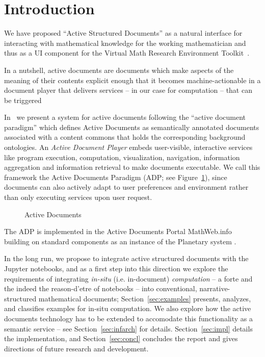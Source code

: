 \section{Introduction}\label{sec:intro}

We have proposed ``Active Structured Documents'' as a natural interface for interacting
with mathematical knowledge for the working mathematician and thus as a UI component for
the \pn Virtual Math Research Environment Toolkit~\cite{ODK-D4.2}.

In a nutshell, active documents are documents which make aspects of the meaning of their
contents explicit enough that it becomes machine-actionable in a document player that
delivers services -- in our case for computation -- that can be triggered 

In~\cite{KohDavGin:psewads11} we present a system for active documents following the
``active document paradigm'' which defines Active Documents as semantically annotated
documents associated with a content commons that holds the corresponding background
ontologies. An \textit{Active Document Player} embeds user-visible, interactive services
like program execution, computation, visualization, navigation, information aggregation
and information retrieval to make documents executable. We call this framework the Active
Documents Paradigm (ADP; see Figure~\ref{fig:activedocs}), since documents can also
actively adapt to user preferences and environment rather than only executing services
upon user request.
\begin{figure}[ht]\centering
  
  \caption{Active Documents}\label{fig:activedocs} 
\end{figure} 

The ADP is implemented in the Active Documents Portal MathWeb.info~\cite{MathHub:on}
building on standard components as an instance of the Planetary system
\cite{Kohlhase:ppte12}.

In the long run, we propose to integrate active structured documents with the Jupyter
notebooks, and as a first step into this direction we explore the requirements of
integrating \emph{in-situ} (i.e. in-document) \emph{computation} -- a forte and the indeed
the reason-d'etre of notebooks -- into conventional, narrative-structured mathematical
documents; Section~\ref{sec:examples} presents, analyzes, and classifies examples for
in-situ computation.  We also explore how the active documents technology has to be
extended to accomodate this functionality as a semantic service -- see
Section~\ref{sec:infarch} for details. Section~\ref{sec:impl} details the implementation,
and Section~\ref{sec:concl} concludes the report and gives directions of future research
and development.


